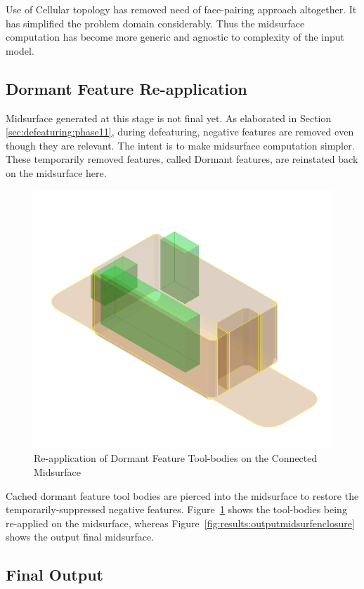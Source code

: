 Use of Cellular topology has removed need of face-pairing approach altogether. It has simplified the problem domain considerably. Thus the midsurface computation has become more generic and agnostic to complexity of the input model.


\subsection{Dormant Feature Re-application}

Midsurface generated at this stage is not final yet. As elaborated in Section \ref{sec:defeaturing:phase11}, during defeaturing, negative features are removed even though they are  relevant. The intent is to make midsurface computation simpler. These temporarily removed features, called Dormant features, are reinstated back on the midsurface here.




\begin{figure}[!h]
\centering     %
\includegraphics[width=0.62\linewidth,valign=t]{images/SheetMetal_Medium_Enclosure_dormant_part}
\caption{Re-application of Dormant Feature Tool-bodies on the Connected Midsurface}
\label{fig:results:dormantenclosure}
\end{figure}





Cached dormant feature tool bodies are pierced into the midsurface to restore the temporarily-suppressed  negative features. Figure~\ref{fig:results:dormantenclosure} shows the tool-bodies being re-applied on the midsurface, whereas Figure~\ref{fig:results:outputmidsurfenclosure} shows the output final midsurface.



\subsection{Final Output}


